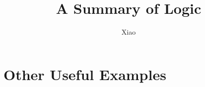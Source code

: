 \documentclass[12pt,a4paper]{report}
\theoremstyle{definition}
\theoremstyle{plain}
\theoremstyle{case}
\theoremstyle{remark}
\begin{document}
\title{A Summary of Logic}
\author{Xiao}
\date{}
\maketitle

\tableofcontents







\chapter{Other Useful Examples}
\label{monad-examples}



\appendix




\end{document}
